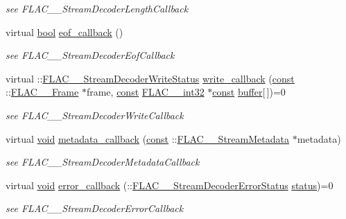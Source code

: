 \begin{DoxyCompactItemize}
\begin{DoxyCompactList}\small\item\em see F\+L\+A\+C\+\_\+\+\_\+\+Stream\+Decoder\+Length\+Callback \end{DoxyCompactList}\item 
virtual \hyperlink{mac_2config_2i386_2lib-src_2libsoxr_2soxr-config_8h_abb452686968e48b67397da5f97445f5b}{bool} \hyperlink{class_f_l_a_c_1_1_decoder_1_1_stream_adfe8736f74fcc1d18374d74d34995353}{eof\+\_\+callback} ()
\begin{DoxyCompactList}\small\item\em see F\+L\+A\+C\+\_\+\+\_\+\+Stream\+Decoder\+Eof\+Callback \end{DoxyCompactList}\item 
virtual \+::\hyperlink{group__flac__stream__decoder_ga73f67eb9e0ab57945afe038751bc62c8}{F\+L\+A\+C\+\_\+\+\_\+\+Stream\+Decoder\+Write\+Status} \hyperlink{class_f_l_a_c_1_1_decoder_1_1_stream_af5a61e9ff720cca3eb38d1f2790f00fb}{write\+\_\+callback} (\hyperlink{getopt1_8c_a2c212835823e3c54a8ab6d95c652660e}{const} \+::\hyperlink{struct_f_l_a_c_____frame}{F\+L\+A\+C\+\_\+\+\_\+\+Frame} $\ast$frame, \hyperlink{getopt1_8c_a2c212835823e3c54a8ab6d95c652660e}{const} \hyperlink{ordinals_8h_a33fd77bfe6d685541a0c034a75deccdc}{F\+L\+A\+C\+\_\+\+\_\+int32} $\ast$\hyperlink{getopt1_8c_a2c212835823e3c54a8ab6d95c652660e}{const} \hyperlink{structbuffer}{buffer}\mbox{[}$\,$\mbox{]})=0
\begin{DoxyCompactList}\small\item\em see F\+L\+A\+C\+\_\+\+\_\+\+Stream\+Decoder\+Write\+Callback \end{DoxyCompactList}\item 
virtual \hyperlink{sound_8c_ae35f5844602719cf66324f4de2a658b3}{void} \hyperlink{class_f_l_a_c_1_1_decoder_1_1_stream_af792eb19438df44b9099da94273f1cbe}{metadata\+\_\+callback} (\hyperlink{getopt1_8c_a2c212835823e3c54a8ab6d95c652660e}{const} \+::\hyperlink{struct_f_l_a_c_____stream_metadata}{F\+L\+A\+C\+\_\+\+\_\+\+Stream\+Metadata} $\ast$metadata)
\begin{DoxyCompactList}\small\item\em see F\+L\+A\+C\+\_\+\+\_\+\+Stream\+Decoder\+Metadata\+Callback \end{DoxyCompactList}\item 
virtual \hyperlink{sound_8c_ae35f5844602719cf66324f4de2a658b3}{void} \hyperlink{class_f_l_a_c_1_1_decoder_1_1_stream_a0dbadd163ade7bc2d1858e7a435d5e52}{error\+\_\+callback} (\+::\hyperlink{group__flac__stream__decoder_ga130e70bd9a73d3c2416247a3e5132ecf}{F\+L\+A\+C\+\_\+\+\_\+\+Stream\+Decoder\+Error\+Status} \hyperlink{rfft2d_test_m_l_8m_a1b5437a866e6f95107b07ba845bc1800}{status})=0
\begin{DoxyCompactList}\small\item\em see F\+L\+A\+C\+\_\+\+\_\+\+Stream\+Decoder\+Error\+Callback \end{DoxyCompactList}\end{DoxyCompactItemize}
